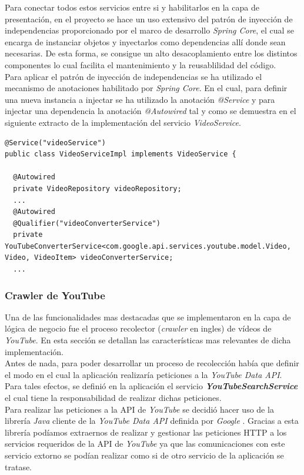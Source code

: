 \documentclass[11pt,a4paper]{article}
\begin{document}
Para conectar todos estos servicios entre si y habilitarlos en la capa de presentación, en el proyecto se hace un uso extensivo del patrón de inyección de independencias proporcionado por el marco de desarrollo \textit{Spring Core}, el cual se encarga de instanciar objetos y inyectarlos como dependencias allí donde  sean necesarias. De esta forma, se consigue un alto desacoplamiento entre los distintos componentes lo cual facilita el mantenimiento y la reusablilidad del código.
\\

Para aplicar el patrón de inyección de independencias se ha utilizado el mecanismo de anotaciones habilitado por \textit{Spring Core}. En el cual, para definir una nueva instancia a injectar se ha utilizado la anotación \textit{@Service} y para injectar una dependencia la anotación \textit{@Autowired} tal y como se demuestra en el siguiente extracto de la implementación del servicio \textit{VideoService}.
\begin{lstlisting}[style=C]
@Service("videoService")
public class VideoServiceImpl implements VideoService {
  
  @Autowired
  private VideoRepository videoRepository;
  ...
  @Autowired
  @Qualifier("videoConverterService")
  private YouTubeConverterService<com.google.api.services.youtube.model.Video, Video, VideoItem> videoConverterService;
  ...
\end{lstlisting}	

\medskip 

\subsubsection{Crawler de YouTube}
Una de las funcionalidades mas destacadas que se implementaron en la capa de lógica de negocio fue el proceso recolector (\textit{crawler} en ingles) de vídeos de \textit{YouTube}. En esta sección se detallan las características mas relevantes de dicha implementación.
\\

Antes de nada, para poder desarrollar un proceso de recolección había que definir el modo en el cual la aplicación realizaría peticiones a la \textit{YouTube Data API}. Para tales efectos, se definió en la aplicación el servicio \textit{\textbf{YouTubeSearchService}} el cual tiene la responsabilidad de realizar dichas peticiones.
\\

Para realizar las peticiones a la API de \textit{YouTube} se decidió hacer uso de la librería \textit{Java} cliente de la \textit{YouTube Data API} definida por \textit{Google} \cite{45}. Gracias a esta librería podíamos extraernos de realizar y gestionar las peticiones HTTP a los servicios requeridos de la API de \textit{YouTube} ya que las comunicaciones con este servicio extorno se podían realizar como si de otro servicio de la aplicación se tratase.
\\
\end{document}

